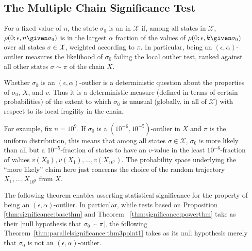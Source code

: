 \documentclass[12pt]{article}
\begin{document}
\subsection*{The Multiple Chain Significance Test}

\begin{definition}
    For a fixed value of \( n \), the state \( \sigma_0 \) is an  in \( \mathcal{X} \) if, among all
    states in \( \mathcal{X} \), \( \rho(0; \epsilon, n \given \sigma_{0})
    \) is in the largest \( \alpha \) fraction of the values of \( \rho(0;
    \epsilon, k \given \sigma_{0}) \) over all states \( \sigma \in
    \mathcal{X} \), weighted according to \( \pi \).  In particular,
    being an \( (\epsilon, \alpha) \)-outlier measures the likelihood of
    \( \sigma_0 \) failing the local outlier test, ranked against all
    other states \( \sigma \sim \pi \) of the chain \( X \).
\end{definition}

Whether \( \sigma_0 \) is an \( (\epsilon, \alpha) \)-outlier is a
deterministic question about the properties of \( \sigma_0 \), \( X \),
and \( v \).  Thus it is a deterministic measure (defined in terms of
certain probabilities) of the extent to which \( \sigma_0 \) is unusual
(globally, in all of \( \mathcal{X} \)) with respect to its local
fragility in the chain.

\begin{example}
    For example, fix \( n = 10^9 \).  If \( \sigma_0 \) is a \( (10^{-6},
    10^{-5}) \)-outlier in \( X \) and \( \pi \) is the uniform
    distribution, this means that among all states \( \sigma \in
    \mathcal{X} \), \( \sigma_0 \) is more likely than all but a \( 10^{-5}
    \)-fraction of states to have an \( v \)-value in the least \( 10^{-6}
    \)-fraction of values \( v(X_0), v(X_1 ), \dots , v(X_{10^9} ) \).
    The probability space underlying the ``more likely'' claim here just
    concerns the choice of the random trajectory \( X_1, \dots, X_{10^9}
    \) from \( X \).
\end{example}

The following theorem enables asserting statistical significance for the
property of being an \( (\epsilon, \alpha) \)-outlier.  In particular,
while tests based on Proposition~%
\ref{thm:significance:basethm} and Theorem~%
\ref{thm:significance:powerthm} take as their [null hypothesis that \(
\sigma_0 \sim \pi \)], the following
Theorem~\ref{thm:parallelsignificance:thm3point1}
takes as its null hypothesis
merely that \( \sigma_{0} \) is not an \( (\epsilon, \alpha) \)-outlier.
\end{document}
